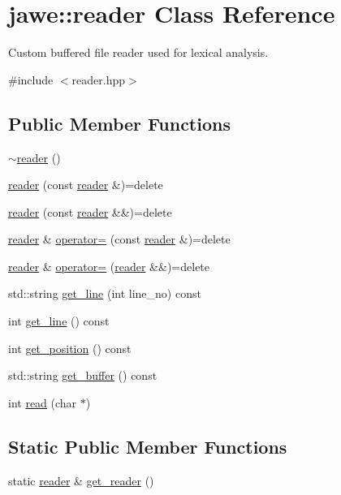 \hypertarget{classjawe_1_1reader}{}\section{jawe\+:\+:reader Class Reference}
\label{classjawe_1_1reader}


Custom buffered file reader used for lexical analysis.  




{\ttfamily \#include $<$reader.\+hpp$>$}

\subsection*{Public Member Functions}
\begin{DoxyCompactItemize}
\item 
\hyperlink{classjawe_1_1reader_ab2708933dc1a57d53d27601c82053a6e}{$\sim$reader} ()
\item 
\hyperlink{classjawe_1_1reader_a0a500fafc39cbd1ec6fdc4e91059ac53}{reader} (const \hyperlink{classjawe_1_1reader}{reader} \&)=delete
\item 
\hyperlink{classjawe_1_1reader_a8ca44a9f065253817097a060e2dc5b61}{reader} (const \hyperlink{classjawe_1_1reader}{reader} \&\&)=delete
\item 
\hyperlink{classjawe_1_1reader}{reader} \& \hyperlink{classjawe_1_1reader_adbac83ebfd22fab33db3e172839228e4}{operator=} (const \hyperlink{classjawe_1_1reader}{reader} \&)=delete
\item 
\hyperlink{classjawe_1_1reader}{reader} \& \hyperlink{classjawe_1_1reader_a9d80f973208eed10e706a75974602acb}{operator=} (\hyperlink{classjawe_1_1reader}{reader} \&\&)=delete
\item 
std\+::string \hyperlink{classjawe_1_1reader_a03b0b9612dfd5623a425d8943e87dd99}{get\+\_\+line} (int line\+\_\+no) const
\item 
int \hyperlink{classjawe_1_1reader_aef5335166d86ae9613b81ecbd00add3a}{get\+\_\+line} () const
\item 
int \hyperlink{classjawe_1_1reader_a29fdb5657f0ce40bdc84c1b71f37db80}{get\+\_\+position} () const
\item 
std\+::string \hyperlink{classjawe_1_1reader_ae9da382dd4177088f1d42952d964a49d}{get\+\_\+buffer} () const
\item 
int \hyperlink{classjawe_1_1reader_a5937acad6c1094dc46e1dfdadd9fd94b}{read} (char $\ast$)
\end{DoxyCompactItemize}
\subsection*{Static Public Member Functions}
\begin{DoxyCompactItemize}
\item 
static \hyperlink{classjawe_1_1reader}{reader} \& \hyperlink{classjawe_1_1reader_a2b5f844b23c223dfbbb8b180cd706f62}{get\+\_\+reader} ()
\end{DoxyCompactItemize}
